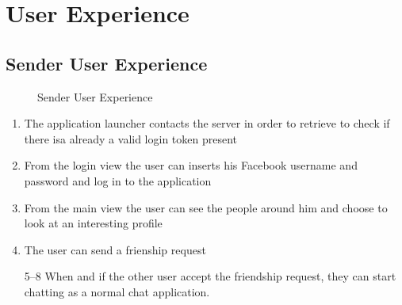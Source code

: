 \section{User Experience}

\subsection{Sender User Experience}

\begin{figure}[H]
\caption{Sender User Experience}
\end{figure}

\begin{enumerate}
\item The application launcher contacts the server in order to retrieve to check if there isa already a valid login token present

\item From the login view the user can inserts his Facebook username and password and log in to the application

\item From the main view the user can see the people around him and choose to look at an interesting profile

\item The user can send a frienship request

\item[5--8] When and if the other user accept the friendship request, they can start chatting as a normal chat application.
\end{enumerate}


